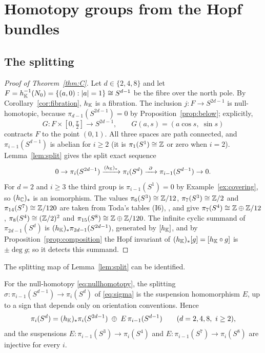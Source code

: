 \section{Homotopy groups from the Hopf bundles}\label{ch:groups}

\subsection{The splitting}

\begin{proof}[Proof of Theorem~\ref{thm:C}]
Let $d\in\{2,4,8\}$ and let $F=h_{\mathbb{K}}^{-1}(N_0)=\{(a,0):|a|=1\}\cong S^{d-1}$ be the fibre over the north pole. By Corollary~\ref{cor:fibration}, $h_{\mathbb{K}}$ is a fibration. The inclusion $j\colon F\to S^{2d-1}$ is null-homotopic, because $\pi_{d-1}(S^{2d-1})=0$ by Proposition~\ref{prop:below}; explicitly,
\begin{equation}\label{eq:nullhomotopy}
G\colon F\times[0,\tfrac\pi2]\to S^{2d-1},\qquad G(a,s)=(a\cos s,\;\sin s)
\end{equation}
contracts $F$ to the point $(0,1)$. All three spaces are path connected, and $\pi_{i-1}(S^{d-1})$ is abelian for $i\ge2$ (it is $\pi_1(S^1)\cong\mathbb{Z}$ or zero when $i=2$). Lemma~\ref{lem:split} gives the split exact sequence
\[
0\to\pi_i(S^{2d-1})\xrightarrow{(h_\K)_*}\pi_i(S^d)\xrightarrow{\ \partial\ }\pi_{i-1}(S^{d-1})\to0 .
\]
For $d=2$ and $i\ge3$ the third group is $\pi_{i-1}(S^1)=0$ by Example~\ref{ex:covering}, so $(h_{\mathbb{C}})_*$ is an isomorphism. The values $\pi_6(S^3)\cong\mathbb{Z}/12$, $\pi_7(S^3)\cong\mathbb{Z}/2$ and $\pi_{14}(S^7)\cong\mathbb{Z}/120$ are taken from Toda's tables (I6), \cite[Chapter~XIV]{Tod62}, and give $\pi_7(S^4)\cong\mathbb{Z}\oplus\mathbb{Z}/12$, $\pi_8(S^4)\cong(\mathbb{Z}/2)^2$ and $\pi_{15}(S^8)\cong\mathbb{Z}\oplus\mathbb{Z}/120$. The infinite cyclic summand of $\pi_{2d-1}(S^d)$ is $(h_{\mathbb{K}})_*\pi_{2d-1}(S^{2d-1})$, generated by $[h_{\mathbb{K}}]$, and by Proposition~\ref{prop:composition} the Hopf invariant of $(h_{\mathbb{K}})_*[g]=[h_{\mathbb{K}}\circ g]$ is $\pm\deg g$; so it detects this summand.
\end{proof}

The splitting map of Lemma~\ref{lem:split} can be identified.

\begin{proposition}\label{prop:sigmaE}
For the null-homotopy \eqref{eq:nullhomotopy}, the splitting $\sigma\colon\pi_{i-1}(S^{d-1})\to\pi_i(S^d)$ of \eqref{eq:sigma} is the suspension homomorphism $E$, up to a sign that depends only on orientation conventions. Hence
\[
\pi_i(S^d)=(h_\K)_*\pi_i(S^{2d-1})\;\oplus\;E\,\pi_{i-1}(S^{d-1})\qquad(d=2,4,8,\ i\ge2),
\]
and the suspensions $E\colon\pi_{i-1}(S^3)\to\pi_i(S^4)$ and $E\colon\pi_{i-1}(S^7)\to\pi_i(S^8)$ are injective for every $i$.
\end{proposition}

